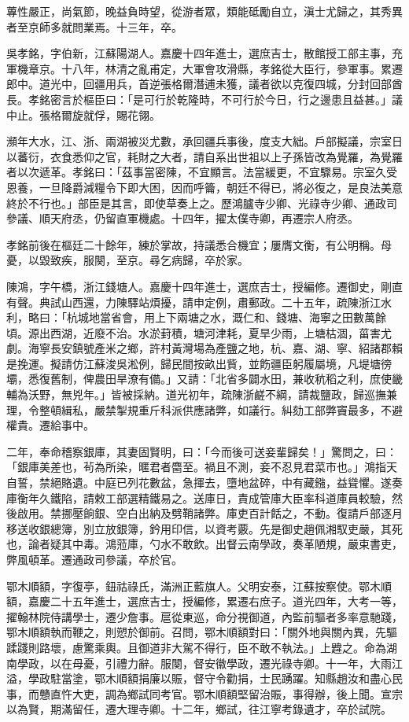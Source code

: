 \begin{pinyinscope}
蓴性嚴正，尚氣節，晚益負時望，從游者眾，類能砥勵自立，滇士尤歸之，其秀異者至京師多就問業焉。十三年，卒。

吳孝銘，字伯新，江蘇陽湖人。嘉慶十四年進士，選庶吉士，散館授工部主事，充軍機章京。十八年，林清之亂甫定，大軍會攻滑縣，孝銘從大臣行，參軍事。累遷郎中。道光中，回疆用兵，首逆張格爾潛逋未獲，議者欲以克復四城，分封回部酋長。孝銘密言於樞臣曰：「是可行於乾隆時，不可行於今日，行之邊患且益甚。」議中止。張格爾旋就俘，賜花翎。

瀕年大水，江、浙、兩湖被災尤數，承回疆兵事後，度支大絀。戶部擬議，宗室日以蕃衍，衣食悉仰之官，耗財之大者，請自系出世祖以上子孫皆改為覺羅，為覺羅者以次遞革。孝銘曰：「茲事當密陳，不宜顯言。法當緩更，不宜驟易。宗室久受恩養，一旦降爵減糧令下即大困，因而呼籥，朝廷不得已，將必復之，是良法美意終於不行也。」部臣是其言，即使草奏上之。歷鴻臚寺少卿、光祿寺少卿、通政司參議、順天府丞，仍留直軍機處。十四年，擢太僕寺卿，再遷宗人府丞。

孝銘前後在樞廷二十餘年，練於掌故，持議悉合機宜；屢膺文衡，有公明稱。母憂，以毀致疾，服闋，至京。尋乞病歸，卒於家。

陳鴻，字午橋，浙江錢塘人。嘉慶十四年進士，選庶吉士，授編修。遷御史，剛直有聲。典試山西還，力陳驛站煩擾，請申定例，肅郵政。二十五年，疏陳浙江水利，略曰：「杭城地當省會，用上下兩塘之水，溉仁和、錢塘、海寧之田數萬餘頃。源出西湖，近廢不治。水淤葑積，塘河津耗，夏旱少雨，上塘枯涸，菑害尤劇。海寧長安鎮號產米之鄉，許村黃灣場為產鹽之地，杭、嘉、湖、寧、紹諸郡賴是挽運。擬請仿江蘇浚吳淞例，歸民間按畝出貲，並飭疆臣躬履屬境，凡堤塘徬壩，悉復舊制，俾農田旱潦有備。」又請：「北省多闢水田，兼收秔稻之利，庶使畿輔為沃野，無兇年。」皆被採納。道光初年，疏陳浙鹺不綱，請裁鹽政，歸巡撫兼理，令整頓緝私，嚴禁掣規重斤科派供應諸弊，如議行。糾劾工部弊竇最多，不避權貴。遷給事中。

二年，奉命稽察銀庫，其妻固賢明，曰：「今而後可送妾輩歸矣！」驚問之，曰：「銀庫美差也，茍為所染，暱君者麕至。禍且不測，妾不忍見君菜市也。」鴻指天自誓，禁絕賂遺。中庭已列花數盆，急揮去，墮地盆碎，中有藏鏹，益聳懼。遂奏庫衡年久鐵陷，請敕工部選精鐵易之。送庫日，責成管庫大臣率科道庫員較驗，然後啟用。禁挪壓餉銀、空白出納及劈鞘諸弊。庫吏百計餂之，不動。復請戶部逐月移送收銀總簿，別立放銀簿，鈐用印信，以資考覈。先是御史趙佩湘馭吏嚴，其死也，論者疑其中毒。鴻蒞庫，勺水不敢飲。出督云南學政，奏革陋規，嚴束書吏，弊風頓革。遷通政司參議，卒於官。

鄂木順額，字復亭，鈕祜祿氏，滿洲正藍旗人。父明安泰，江蘇按察使。鄂木順額，嘉慶二十五年進士，選庶吉士，授編修，累遷右庶子。道光四年，大考一等，擢翰林院侍講學士，遷少詹事。扈從東巡，命分視御道，內監前驅者多率意馳踐，鄂木順額執而鞭之，則愬於御前。召問，鄂木順額對曰：「關外地與關內異，先驅蹂踐則路壞，慮驚乘輿。且御道非大駕不得行，臣不敢不執法。」上韙之。命為湖南學政，以在母憂，引禮力辭。服闋，督安徽學政，遷光祿寺卿。十一年，大雨江溢，學政駐當塗，鄂木順額捐廉以賑，督守令勸捐，士民踴躍。知縣趙汝和盡心民事，而戇直忤大吏，調為鄉試同考官。鄂木順額堅留治賑，事得辦，後上聞。宣宗以為賢，期滿留任，遷大理寺卿。十二年，鄉試，往江寧考錄遺才，卒於試院。


\end{pinyinscope}
